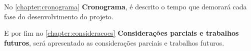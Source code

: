 \par
No \autoref{chapter:cronograma} \textbf{Cronograma}, é descrito o tempo que demorará cada fase do desenvolvimento do projeto.

\par
E por fim no \autoref{chapter:consideracoes} \textbf{Considerações parciais e trabalhos futuros}, será apresentado as considerações parciais e trabalhos futuros.

